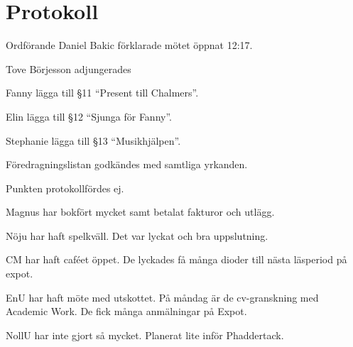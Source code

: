 \documentclass[10pt]{article}
\def\mo{Daniel Bakic}
\begin{document}
\section*{Protokoll}
\begin{paragrafer}
	Ordförande {\mo} förklarade mötet öppnat 12:17.

	{\valavmo}

	{\valavms}

	{\valavj}

	{\tosg}

	{\ingaadj}
	Tove Börjesson adjungerades

	Fanny \ypa lägga till \S11 ``Present till Chalmers''.
	
	Elin \ypa lägga till \S12 ``Sjunga för Fanny''.
	
	Stephanie \ypa lägga till \S13 ``Musikhjälpen''.

	Föredragningslistan godkändes med samtliga yrkanden.


	\begin{fyllnadsval} %
	\end{fyllnadsval}

	\begin{paragrafer}
		Punkten protokollfördes ej.


		Magnus har bokfört mycket samt betalat fakturor och utlägg.
		
		Nöju har haft spelkväll. Det var lyckat och bra uppslutning.
		
		CM har haft caféet öppet. De lyckades få många dioder till nästa läsperiod på expot.
		
		EnU har haft möte med utskottet. På måndag är de cv-granskning med Academic Work. De fick många anmälningar på Expot.
		
		NollU har inte gjort så mycket. Planerat lite inför Phaddertack.
		

\end{paragrafer}
\end{paragrafer}
\end{document}
